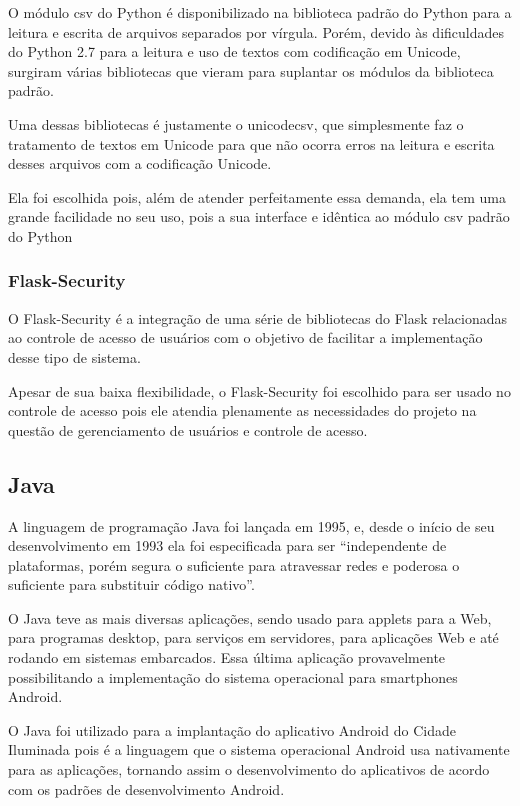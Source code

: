 \documentclass[
	article,			%
	11pt,				%
	oneside,			%
	a4paper,			%
	english,			%
	brazil,				%
	sumario=tradicional
	]{abntex2}
\begin{document}
O módulo csv do Python é disponibilizado na biblioteca padrão do Python para a leitura e escrita de arquivos separados por vírgula.
Porém, devido às dificuldades do Python 2.7 para a leitura e uso de textos com codificação em Unicode, surgiram várias bibliotecas que vieram para suplantar os módulos da biblioteca padrão.

Uma dessas bibliotecas é justamente o unicodecsv, que simplesmente faz o tratamento de textos em Unicode para que não ocorra erros na leitura e escrita desses arquivos com a codificação Unicode. \cite{unicodecsv}

Ela foi escolhida pois, além de atender perfeitamente essa demanda, ela tem uma grande facilidade no seu uso, pois a sua interface e idêntica ao módulo csv padrão do Python

\subsubsection{Flask-Security}

O Flask-Security é a integração de uma série de bibliotecas do Flask relacionadas ao controle de acesso de usuários com o objetivo de facilitar a implementação desse tipo de sistema. \cite{flasksecurity}

Apesar de sua baixa flexibilidade, o Flask-Security foi escolhido para ser usado no controle de acesso pois ele atendia plenamente as necessidades do projeto na questão de gerenciamento de usuários e controle de acesso.

\subsection{Java}

A linguagem de programação Java foi lançada em 1995, e, desde o início de seu desenvolvimento em 1993 ela foi especificada para ser “independente de plataformas, porém segura o suficiente para atravessar redes e poderosa o suficiente para substituir código nativo”. \cite{java}

O Java teve as mais diversas aplicações, sendo usado para applets para a Web, para programas desktop, para serviços em servidores, para aplicações Web e até rodando em sistemas embarcados.
Essa última aplicação provavelmente possibilitando a implementação do sistema operacional para smartphones Android.

O Java foi utilizado para a implantação do aplicativo Android do Cidade Iluminada pois é a linguagem que o sistema operacional Android usa nativamente para as aplicações, tornando assim o desenvolvimento do aplicativos de acordo com os padrões de desenvolvimento Android.
\end{document}
